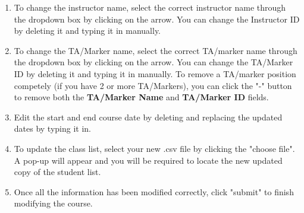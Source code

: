 \documentclass{article}
\begin{document}
\begin{enumerate}
	\begin {enumerate}
		\item To change the instructor name, select the correct instructor name through the dropdown box by clicking on the arrow. You can change the Instructor ID by deleting it and typing it in manually.
	\item To change the TA/Marker name, select the correct TA/marker name through the dropdown box by clicking on the arrow. You can change the TA/Marker ID by deleting it and typing it in manually. To remove a TA/marker position competely (if you have 2 or more TA/Markers), you can click the "-" button to remove both the \textbf{TA/Marker Name} and \textbf{TA/Marker ID} fields.
	\item Edit the start and end course date by deleting and replacing the updated dates by typing it in.
	\item To update the class list, select your new .csv file by clicking the "choose file". A pop-up will appear and you will be required to locate the new updated copy of the student list.
	\item Once all the information has been modified correctly, click "submit" to finish modifying the course.
	\end {enumerate}
\end {enumerate}
\end{document}

